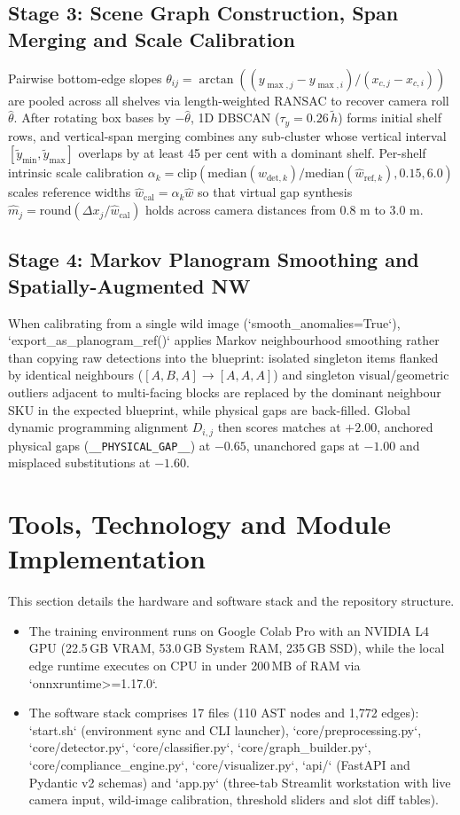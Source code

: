 \documentclass[10pt,a4paper]{article}
\begin{document}
\subsection{Stage 3: Scene Graph Construction, Span Merging and Scale Calibration}
Pairwise bottom-edge slopes $\theta_{ij} = \arctan((y_{\max,j} - y_{\max,i})/(x_{c,j} - x_{c,i}))$ are pooled across all shelves via length-weighted RANSAC to recover camera roll $\hat{\theta}$. After rotating box bases by $-\hat{\theta}$, 1D DBSCAN ($\tau_y = 0.26\,\tilde{h}$) forms initial shelf rows, and vertical-span merging combines any sub-cluster whose vertical interval $[\tilde{y}_{\min}, \tilde{y}_{\max}]$ overlaps by at least 45 per cent with a dominant shelf. Per-shelf intrinsic scale calibration $\alpha_k = \text{clip}(\text{median}(w_{\text{det},k})/\text{median}(\hat{w}_{\text{ref},k}), 0.15, 6.0)$ scales reference widths $\hat{w}_{\text{cal}} = \alpha_k \hat{w}$ so that virtual gap synthesis $\hat{m}_j = \text{round}(\Delta x_j / \hat{w}_{\text{cal}})$ holds across camera distances from $0.8\text{ m}$ to $3.0\text{ m}$.

\subsection{Stage 4: Markov Planogram Smoothing and Spatially-Augmented NW}
When calibrating from a single wild image (`smooth_anomalies=True`), `export_as_planogram_ref()` applies Markov neighbourhood smoothing rather than copying raw detections into the blueprint: isolated singleton items flanked by identical neighbours ($[A, B, A] \to [A, A, A]$) and singleton visual/geometric outliers adjacent to multi-facing blocks are replaced by the dominant neighbour SKU in the expected blueprint, while physical gaps are back-filled. Global dynamic programming alignment $D_{i,j}$ then scores matches at $+2.00$, anchored physical gaps (\texttt{\_\_PHYSICAL\_GAP\_\_}) at $-0.65$, unanchored gaps at $-1.00$ and misplaced substitutions at $-1.60$.

\section{Tools, Technology and Module Implementation}
This section details the hardware and software stack and the repository structure.
\begin{itemize}\setlength{\itemsep}{2pt}\setlength{\parskip}{0pt}
    \item The training environment runs on Google Colab Pro with an NVIDIA L4 GPU (22.5\,GB VRAM, 53.0\,GB System RAM, 235\,GB SSD), while the local edge runtime executes on CPU in under 200\,MB of RAM via `onnxruntime>=1.17.0`.
    \item The software stack comprises 17 files (110 AST nodes and 1,772 edges): `start.sh` (environment sync and CLI launcher), `core/preprocessing.py`, `core/detector.py`, `core/classifier.py`, `core/graph_builder.py`, `core/compliance_engine.py`, `core/visualizer.py`, `api/` (FastAPI and Pydantic v2 schemas) and `app.py` (three-tab Streamlit workstation with live camera input, wild-image calibration, threshold sliders and slot diff tables).
\end{itemize}
\end{document}

